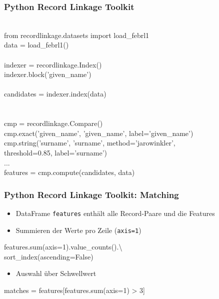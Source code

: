     
    \begin{frame}[shrink]
    \frametitle{Python Record Linkage Toolkit}
    
    \begin{python}
     \\
    from recordlinkage.datasets import load\_febrl1 \\
    data = load\_febrl1() \\
     \\
    indexer = recordlinkage.Index() \\
    indexer.block('given\_name') \\
     \\
    candidates = indexer.index(data) \\
    \\
     \\
    cmp = recordlinkage.Compare() \\
    cmp.exact('given\_name', 'given\_name', label='given\_name') \\
    cmp.string('surname', 'surname', method='jarowinkler', \\
    \1 threshold=0.85, label='surname') \\
    ...\\
    features = cmp.compute(candidates, data) 
    \end{python}
    
    \end{frame}
    
    \begin{frame}
    \frametitle{Python Record Linkage Toolkit: Matching}
    
    \begin{itemize}
    \item DataFrame \texttt{features} enthält alle Record-Paare und die Features
    \item Summieren der Werte pro Zeile (\texttt{axis=1})
    \end{itemize}
    \begin{python}
    features.sum(axis=1).value\_counts().\textbackslash \\
    \1 sort\_index(ascending=False)
    \end{python}
    
    \begin{itemize}
    \item Auswahl über Schwellwert
    \end{itemize}
    
    \begin{python}
    matches = features[features.sum(axis=1) > 3]
    \end{python}
    
    \end{frame}
    
